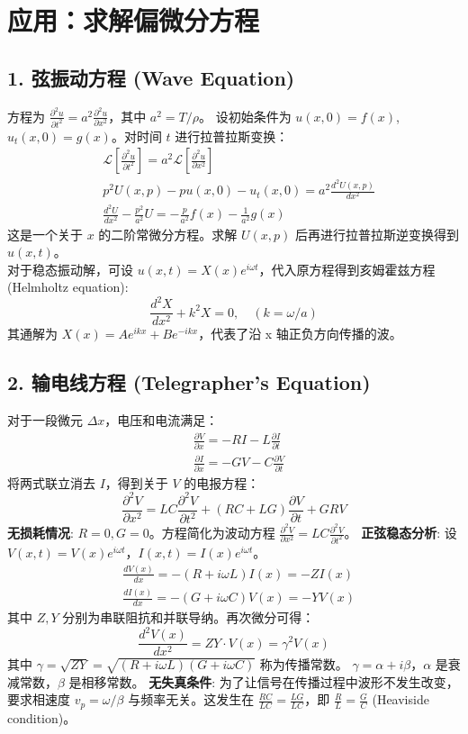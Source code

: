 \documentclass{article}
\begin{document}
	\section*{应用：求解偏微分方程}
	
	\subsection*{1. 弦振动方程 (Wave Equation)}
	方程为 $\frac{\partial^2 u}{\partial t^2} = a^2 \frac{\partial^2 u}{\partial x^2}$，其中 $a^2=T/\rho$。
	设初始条件为 $u(x,0) = f(x)$, $u_t(x,0)=g(x)$。对时间 $t$ 进行拉普拉斯变换：
	\begin{align*}
		& \mathcal{L}\left[\frac{\partial^2 u}{\partial t^2}\right] = a^2 \mathcal{L}\left[\frac{\partial^2 u}{\partial x^2}\right] \\
		& p^2 U(x,p) - p u(x,0) - u_t(x,0) = a^2 \frac{d^2 U(x,p)}{dx^2} \\
		& \frac{d^2 U}{dx^2} - \frac{p^2}{a^2}U = -\frac{p}{a^2}f(x) - \frac{1}{a^2}g(x)
	\end{align*}
	这是一个关于 $x$ 的二阶常微分方程。求解 $U(x,p)$ 后再进行拉普拉斯逆变换得到 $u(x,t)$。\\
	对于稳态振动解，可设 $u(x,t)=X(x)e^{i\omega t}$，代入原方程得到亥姆霍兹方程 (Helmholtz equation):
	$$ 
	\frac{d^2 X}{dx^2} + k^2 X = 0, \quad (k=\omega/a) 
	$$
	其通解为 $X(x) = A e^{ikx} + B e^{-ikx}$，代表了沿 x 轴正负方向传播的波。
	
	\subsection*{2. 输电线方程 (Telegrapher's Equation)}
	对于一段微元 $\Delta x$，电压和电流满足：
	\begin{align*}
		& \frac{\partial V}{\partial x} = -RI - L \frac{\partial I}{\partial t} \\
		& \frac{\partial I}{\partial x} = -GV - C \frac{\partial V}{\partial t}
	\end{align*}
	将两式联立消去 $I$，得到关于 $V$ 的电报方程：
	$$ 
	\frac{\partial^2 V}{\partial x^2} = LC \frac{\partial^2 V}{\partial t^2} + (RC+LG) \frac{\partial V}{\partial t} + GRV 
	$$
	\textbf{无损耗情况}: $R=0, G=0$。方程简化为波动方程 $\frac{\partial^2 V}{\partial x^2} = LC \frac{\partial^2 V}{\partial t^2}$。
	\textbf{正弦稳态分析}: 设 $V(x,t) = V(x)e^{i\omega t}$，$I(x,t) = I(x)e^{i\omega t}$。
	\begin{align*}
		& \frac{dV(x)}{dx} = -(R+i\omega L)I(x) = -Z I(x) \\
		& \frac{dI(x)}{dx} = -(G+i\omega C)V(x) = -Y V(x)
	\end{align*}
	其中 $Z, Y$ 分别为串联阻抗和并联导纳。再次微分可得：
	$$ 
	\frac{d^2 V(x)}{dx^2} = ZY \cdot V(x) = \gamma^2 V(x) 
	$$
	其中 $\gamma = \sqrt{ZY} = \sqrt{(R+i\omega L)(G+i\omega C)}$ 称为传播常数。
	$\gamma = \alpha + i\beta$，$\alpha$ 是衰减常数，$\beta$ 是相移常数。
	\textbf{无失真条件}: 为了让信号在传播过程中波形不发生改变，要求相速度 $v_p = \omega/\beta$ 与频率无关。这发生在 $\frac{RC}{LC} = \frac{LG}{LC}$，即 $\frac{R}{L} = \frac{G}{C}$ (Heaviside condition)。
	
\end{document}
